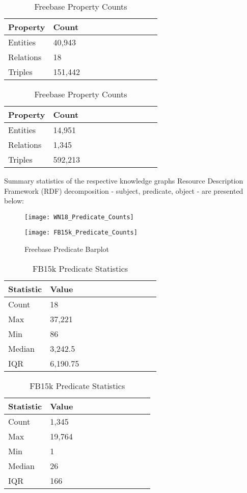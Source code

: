 \begin{table}[H]
	\parbox{.5\linewidth}{
		\caption{WN18 Property Counts}
		\centering
		\begin{tabular}{lllllllllll}
  			\textbf{Property} & \textbf{Count}  \\
  			\hline
  			Entities & 40,943  \\
  			Relations & 18  \\
  			Triples & 151,442 \\
		\end{tabular}
		}
	\hfill
	\parbox{.5\linewidth}{
		\caption{Freebase Property Counts}
		\centering
		\begin{tabular}{lllllllllll}
  			\textbf{Property} & \textbf{Count}  \\
  			\hline
  			Entities & 14,951   \\
  			Relations & 1,345  \\
  			Triples & 592,213  \\
		\end{tabular}
		}
\end{table}


Summary statistics of the respective knowledge graphs Resource Description Framework (RDF) decomposition - subject, predicate, object - are presented below:


\begin{figure}[H]
	\parbox{.5\linewidth}{
   		\caption{WN18 Predicate Barplot}
   		\centering
    		\texttt{[image: WN18\_Predicate\_Counts]}
		}
	\hfill
	\parbox{.5\linewidth}{
		\caption{Freebase Predicate Barplot}
   		\centering
		\texttt{[image: FB15k\_Predicate\_Counts]}
		}
\end{figure}

\begin{table}[H]
	\parbox{.5\linewidth}{
		\caption{WN18 Predicate Statistics}
		\centering
		\begin{tabular}{lllllllllll}
  			\textbf{Statistic} & \textbf{Value}  \\
  			\hline
			Count & 18 \\
			Max & 37,221  \\
			Min & 86 \\
  			Median & 3,242.5  \\
  			IQR & 6,190.75  \\
		\end{tabular}
		}
	\hfill
	\parbox{.5\linewidth}{
		\caption{FB15k Predicate Statistics}
		\centering
		\begin{tabular}{lllllllllll}
  			\textbf{Statistic} & \textbf{Value}  \\
  			\hline
			Count & 1,345 \\
			Max & 19,764  \\
			Min & 1  \\
  			Median & 26  \\
  			IQR & 166  \\
		\end{tabular}
		}
\end{table}

